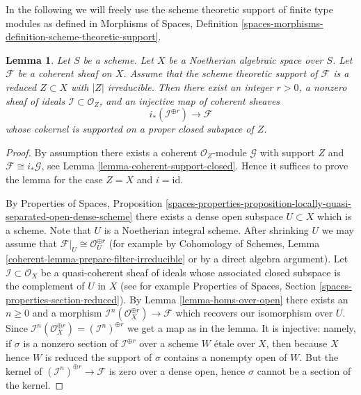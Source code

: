 \documentclass{stacks-project}
\theoremstyle{plain}
\newtheorem{lemma}[subsection]{Lemma}
\theoremstyle{definition}
\theoremstyle{remark}
\numberwithin{equation}{subsection}
\begin{document}
\noindent
In the following we will freely use the scheme theoretic support of
finite type modules as defined in Morphisms of Spaces, Definition
\ref{spaces-morphisms-definition-scheme-theoretic-support}.

\begin{lemma}
\label{lemma-prepare-filter-irreducible}
Let $S$ be a scheme. Let $X$ be a Noetherian algebraic space over $S$.
Let $\mathcal{F}$ be a coherent sheaf on $X$. Assume that the scheme
theoretic support of $\mathcal{F}$ is a reduced $Z \subset X$ with
$|Z|$ irreducible. Then there exist an integer $r > 0$, a nonzero
sheaf of ideals $\mathcal{I} \subset \mathcal{O}_Z$, and an injective
map of coherent sheaves
$$
i_*\left(\mathcal{I}^{\oplus r}\right) \to \mathcal{F}
$$
whose cokernel is supported on a proper closed subspace of $Z$.
\end{lemma}

\begin{proof}
By assumption there exists a coherent $\mathcal{O}_Z$-module
$\mathcal{G}$ with support $Z$ and $\mathcal{F} \cong i_*\mathcal{G}$, see
Lemma \ref{lemma-coherent-support-closed}. Hence it suffices to prove the
lemma for the case $Z = X$ and $i = \text{id}$.

\medskip\noindent
By Properties of Spaces, Proposition
\ref{spaces-properties-proposition-locally-quasi-separated-open-dense-scheme}
there exists a dense open subspace $U \subset X$ which is a scheme. Note that
$U$ is a Noetherian integral scheme. After shrinking $U$ we may assume
that $\mathcal{F}|_U \cong \mathcal{O}_U^{\oplus r}$ (for example by
Cohomology of Schemes, Lemma \ref{coherent-lemma-prepare-filter-irreducible}
or by a direct algebra argument). Let $\mathcal{I} \subset \mathcal{O}_X$
be a quasi-coherent sheaf of ideals whose associated closed subspace
is the complement of $U$ in $X$ (see for example
Properties of Spaces, Section \ref{spaces-properties-section-reduced}). 
By Lemma \ref{lemma-homs-over-open} there exists an $n \geq 0$ and a
morphism $\mathcal{I}^n(\mathcal{O}_X^{\oplus r}) \to \mathcal{F}$
which recovers our isomorphism over $U$. Since
$\mathcal{I}^n(\mathcal{O}_X^{\oplus r}) = (\mathcal{I}^n)^{\oplus r}$
we get a map as in the lemma. It is injective: namely, if $\sigma$ is
a nonzero section of $\mathcal{I}^{\oplus r}$ over a scheme $W$ \'etale
over $X$, then because $X$ hence $W$ is reduced the support of $\sigma$
contains a nonempty open of $W$. But the kernel of
$(\mathcal{I}^n)^{\oplus r} \to \mathcal{F}$ is zero
over a dense open, hence $\sigma$ cannot be a section of the kernel.
\end{proof}
\end{document}
